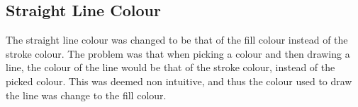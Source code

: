 \subsection{Straight Line Colour}
The straight line colour was changed to be that of the fill colour instead of the stroke colour.
The problem was that when picking a colour and then drawing a line, the colour of the line would be that of the stroke colour, instead of the picked colour.
This was deemed non intuitive, and thus the colour used to draw the line was change to the fill colour.